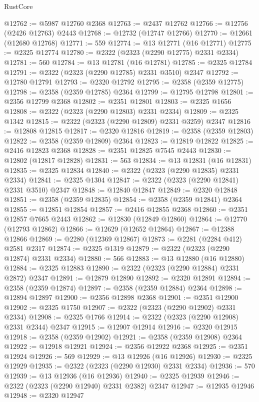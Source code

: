 \begin{lexlean}{RustCore}
\begin{coremodule}
@12762 := @5987 @12760 @2368
@12763 := @2437 @12762
@12766 := @12756 (@2426 @12763) @2443
@12768 := @12732 (@12747 @12766)
@12770 := @12661 (@12680 @12768)
@12771 := 559
@12774 := @13 @12771 (@16 @12771)
@12775 := @2325 @12774
@12780 := @2322 (@2323 (@2290 @12775) @2331 @2334)
@12781 := 560
@12784 := @13 @12781 (@16 @12781)
@12785 := @2325 @12784
@12791 := @2322 (@2323 (@2290 @12785) @2331 @3510) @2347
@12792 := @12780 @12791
@12793 := @2320 @12792
@12795 := @2358 (@2359 @12775)
@12798 := @2358 (@2359 @12785) @2364
@12799 := @12795 @12798
@12801 := @2356 @12799 @2368
@12802 := @2351 @12801
@12803 := @2325 @1656
@12808 := @2322 (@2323 (@2290 @12803) @2331 @2334)
@12809 := @2325 @1342
@12815 := @2322 (@2323 (@2290 @12809) @2331 @3259) @2347
@12816 := @12808 @12815
@12817 := @2320 @12816
@12819 := @2358 (@2359 @12803)
@12822 := @2358 (@2359 @12809) @2364
@12823 := @12819 @12822
@12825 := @2416 @12823 @2368
@12828 := @2351 @12825 @7545 @2443
@12830 := @12802 (@12817 @12828)
@12831 := 563
@12834 := @13 @12831 (@16 @12831)
@12835 := @2325 @12834
@12840 := @2322 (@2323 (@2290 @12835) @2331 @2334)
@12841 := @2325 @1304
@12847 := @2322 (@2323 (@2290 @12841) @2331 @3510) @2347
@12848 := @12840 @12847
@12849 := @2320 @12848
@12851 := @2358 (@2359 @12835)
@12854 := @2358 (@2359 @12841) @2364
@12855 := @12851 @12854
@12857 := @2416 @12855 @2368
@12860 := @2351 @12857 @7665 @2443
@12862 := @12830 (@12849 @12860)
@12864 := @12770 (@12793 @12862)
@12866 := @12629 (@12652 @12864)
@12867 := @12388 @12866
@12869 := @2280 (@12369 @12867)
@12873 := @2281 (@2284 @412) @2581 @2317
@12874 := @2325 @1319
@12879 := @2322 (@2323 (@2290 @12874) @2331 @2334)
@12880 := 566
@12883 := @13 @12880 (@16 @12880)
@12884 := @2325 @12883
@12890 := @2322 (@2323 (@2290 @12884) @2331 @2872) @2347
@12891 := @12879 @12890
@12892 := @2320 @12891
@12894 := @2358 (@2359 @12874)
@12897 := @2358 (@2359 @12884) @2364
@12898 := @12894 @12897
@12900 := @2356 @12898 @2368
@12901 := @2351 @12900
@12902 := @2325 @1750
@12907 := @2322 (@2323 (@2290 @12902) @2331 @2334)
@12908 := @2325 @1766
@12914 := @2322 (@2323 (@2290 @12908) @2331 @2344) @2347
@12915 := @12907 @12914
@12916 := @2320 @12915
@12918 := @2358 (@2359 @12902)
@12921 := @2358 (@2359 @12908) @2364
@12922 := @12918 @12921
@12924 := @2356 @12922 @2368
@12925 := @2351 @12924
@12926 := 569
@12929 := @13 @12926 (@16 @12926)
@12930 := @2325 @12929
@12935 := @2322 (@2323 (@2290 @12930) @2331 @2334)
@12936 := 570
@12939 := @13 @12936 (@16 @12936)
@12940 := @2325 @12939
@12946 := @2322 (@2323 (@2290 @12940) @2331 @2382) @2347
@12947 := @12935 @12946
@12948 := @2320 @12947

\end{coremodule}
\end{lexlean}
